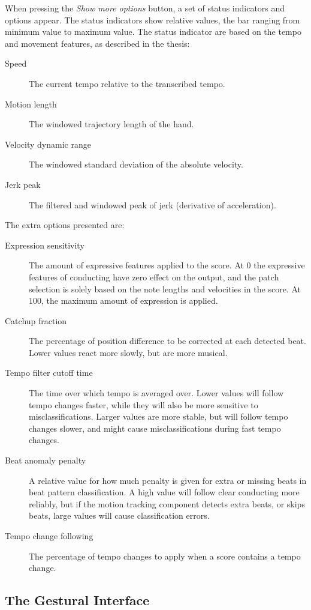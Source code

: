 \documentclass[12pt,a4paper]{article}
\begin{document}
When pressing the \textit{Show more options} button,
a set of status indicators and options appear.
The status indicators show relative values,
the bar ranging from minimum value to maximum value.
The status indicator are based on the tempo and movement
features, as described in the thesis:
\begin{description}
\item[Speed] The current tempo relative to the transcribed tempo.
\item[Motion length] The windowed trajectory length of the hand.
\item[Velocity dynamic range] The windowed standard deviation of the absolute velocity.
\item[Jerk peak] The filtered and windowed peak of jerk (derivative of acceleration).
\end{description}
The extra options presented are:
\begin{description}
\item[Expression sensitivity] The amount of expressive features applied to the score. At $0$ the expressive features of conducting have zero effect on the output, and the patch selection is solely based on the note lengths and velocities in the score. At $100$, the maximum amount of expression is applied.
\item[Catchup fraction] The percentage of position difference to be corrected at each detected beat. Lower values react more slowly, but are more musical.
\item[Tempo filter cutoff time] The time over which tempo is averaged over. Lower values will follow tempo changes faster, while they will also be more sensitive to misclassifications. Larger values are more stable, but will follow tempo changes slower, and might cause misclassifications during fast tempo changes.
\item[Beat anomaly penalty] A relative value for how much penalty is given for extra or missing beats in beat pattern classification. A high value will follow clear conducting more reliably, but if the motion tracking component detects extra beats, or skips beats, large values will cause classification errors.
\item[Tempo change following] The percentage of tempo changes to apply when a score contains a tempo change.
\end{description}


\subsection{The Gestural Interface}
\end{document}
